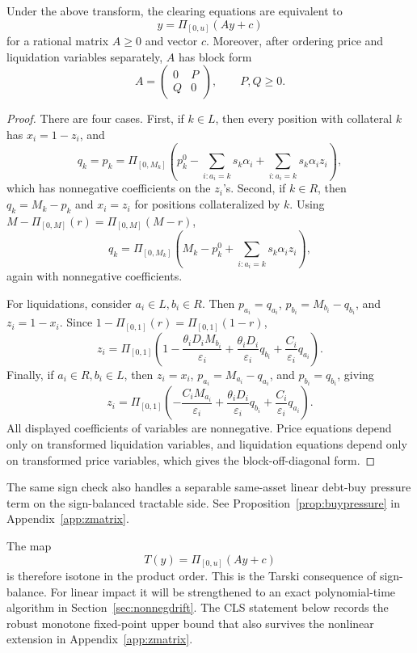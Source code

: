 \documentclass{llncs}
\newcommand{\clip}{\Pi}
\newcommand{\eps}{\varepsilon}
\begin{document}
\begin{lemma}
\label{lem:nonneg}
Under the above transform, the clearing equations are equivalent to
\begin{equation}
  y=\clip_{[0,u]}(Ay+c)
  \label{eq:nonneg}
\end{equation}
for a rational matrix \(A\ge 0\) and vector \(c\). Moreover, after ordering price and liquidation variables separately, \(A\) has block form
\[
        A=\begin{pmatrix}0&P\\ Q&0\end{pmatrix},\qquad P,Q\ge0.
\]
\end{lemma}
\begin{proof}
There are four cases. First, if \(k\in L\), then every position with collateral \(k\) has \(x_i=1-z_i\), and
\[
q_k=p_k=\clip_{[0,M_k]}\!\left(p_k^0-\sum_{i:a_i=k}s_k\alpha_i+\sum_{i:a_i=k}s_k\alpha_i z_i\right),
\]
which has nonnegative coefficients on the \(z_i\)'s. Second, if \(k\in R\), then \(q_k=M_k-p_k\) and \(x_i=z_i\) for positions collateralized by \(k\). Using \(M-\clip_{[0,M]}(r)=\clip_{[0,M]}(M-r)\),
\[
q_k=\clip_{[0,M_k]}\!\left(M_k-p_k^0+\sum_{i:a_i=k}s_k\alpha_i z_i\right),
\]
again with nonnegative coefficients.

For liquidations, consider \(a_i\in L,b_i\in R\). Then \(p_{a_i}=q_{a_i}\), \(p_{b_i}=M_{b_i}-q_{b_i}\), and \(z_i=1-x_i\). Since \(1-\clip_{[0,1]}(r)=\clip_{[0,1]}(1-r)\),
\[
z_i=\clip_{[0,1]}\!\left(1-\frac{\theta_iD_iM_{b_i}}{\eps_i}+\frac{\theta_iD_i}{\eps_i}q_{b_i}+\frac{C_i}{\eps_i}q_{a_i}\right).
\]
Finally, if \(a_i\in R,b_i\in L\), then \(z_i=x_i\), \(p_{a_i}=M_{a_i}-q_{a_i}\), and \(p_{b_i}=q_{b_i}\), giving
\[
z_i=\clip_{[0,1]}\!\left(-\frac{C_iM_{a_i}}{\eps_i}+\frac{\theta_iD_i}{\eps_i}q_{b_i}+\frac{C_i}{\eps_i}q_{a_i}\right).
\]
All displayed coefficients of variables are nonnegative. Price equations depend only on transformed liquidation variables, and liquidation equations depend only on transformed price variables, which gives the block-off-diagonal form.
\end{proof}

The same sign check also handles a separable same-asset linear debt-buy pressure term on the sign-balanced tractable side. See Proposition~\ref{prop:buypressure} in Appendix~\ref{app:zmatrix}.

The map
\[
       T(y)=\clip_{[0,u]}(Ay+c)
\]
is therefore isotone in the product order. This is the Tarski consequence of sign-balance. For linear impact it will be strengthened to an exact polynomial-time algorithm in Section~\ref{sec:nonnegdrift}. The CLS statement below records the robust monotone fixed-point upper bound that also survives the nonlinear extension in Appendix~\ref{app:zmatrix}.
\end{document}
